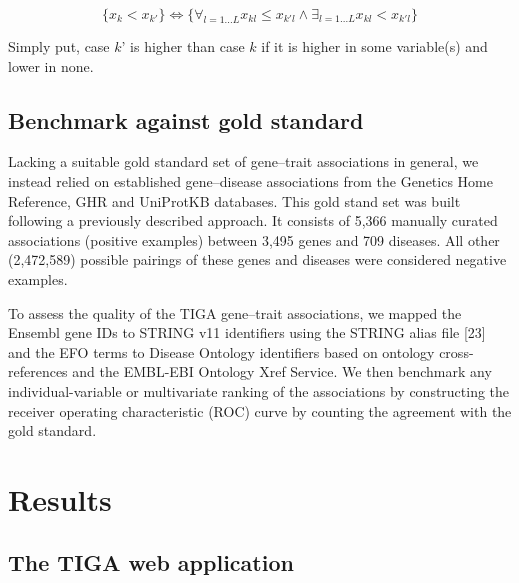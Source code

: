 \begin{equation}
    \{ x_k < x_{k'} \} \Leftrightarrow \{ \forall_{l=1...L} x_{kl} \leq x_{k'l} \wedge \exists_{l=1...L} x_{kl} < x_{k'l} \}
\end{equation}


Simply put, case $k’$ is higher than case $k$ if it is higher in some variable(s) and lower in none.

\subsection{Benchmark against gold standard}

Lacking a suitable gold standard set of gene–trait associations in general, we instead relied on established gene–disease associations from the Genetics Home Reference, GHR\cite{Fomous2006-wm} and UniProtKB\cite{UniProt_Consortium2018-kq} databases. This gold stand set was built following a previously described approach\cite{Pletscher-Frankild2015-oo}. It consists of 5,366 manually curated associations (positive examples) between 3,495 genes and 709 diseases. All other (2,472,589) possible pairings of these genes and diseases were considered negative examples.

To assess the quality of the TIGA gene–trait associations, we mapped the Ensembl gene IDs to STRING v11 identifiers using the STRING alias file [23] and the EFO terms to Disease Ontology\cite{Schriml2019-uh} identifiers based on ontology cross-references and the EMBL-EBI Ontology Xref Service. We then benchmark any individual-variable or multivariate ranking of the associations by constructing the receiver operating characteristic (ROC) curve by counting the agreement with the gold standard.

\section{Results}

\subsection{The TIGA web application}

